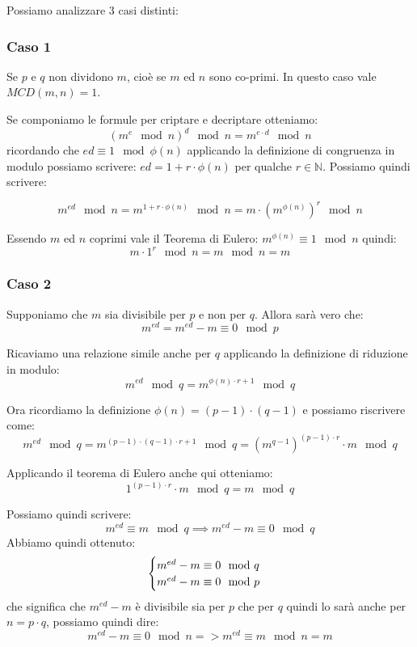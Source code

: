 Possiamo analizzare 3 casi distinti:

\subsubsection{Caso 1}
Se $p$ e $q$ non dividono $m$, cioè se $m$ ed $n$ sono co-primi. In questo caso vale $MCD(m,n)=1$.

Se componiamo le formule per criptare e decriptare otteniamo:
$$ (m^e \mod n)^d \mod n = m^{e \cdot d} \mod n $$
ricordando che $ed \equiv 1 \mod \phi(n)$ applicando la definizione di congruenza in modulo possiamo scrivere: $ed = 1 + r \cdot \phi(n)$ per qualche $r \in \mathbb{N}$.
Possiamo quindi scrivere:

$$ m^{ed} \mod n = m^{1 + r \cdot \phi(n)} \mod n = m \cdot (m^{\phi(n)})^{r} \mod n$$

Essendo $m$ ed $n$ coprimi vale il Teorema di Eulero: $m^{\phi(n)} \equiv 1 \mod n$ quindi:
$$ m \cdot 1^r \mod n = m \mod n = m $$

\subsubsection{Caso 2}
Supponiamo che $m$ sia divisibile per $p$ e non per $q$. Allora sarà vero che:
$$ m^{ed} = m^{ed} - m \equiv 0 \mod p $$

Ricaviamo una relazione simile anche per $q$ applicando la definizione di riduzione in modulo:
$$ m^{ed} \mod q = m^{\phi(n) \cdot r + 1} \mod q $$

Ora ricordiamo la definizione $\phi(n) = (p-1)\cdot(q-1)$ e possiamo riscrivere come:
$$ m^{ed} \mod q = m^{(p-1)\cdot(q-1)\cdot{r} + 1} \mod q = (m^{q-1})^{(p-1)\cdot{r}}\cdot{m} \mod q $$

Applicando il teorema di Eulero anche qui otteniamo:
$$ 1^{(p-1)\cdot{r}}\cdot{m} \mod q = m \mod q$$

Possiamo quindi scrivere:
$$ m^{ed} \equiv m \mod q \implies m^{ed} - m \equiv 0 \mod q $$
Abbiamo quindi ottenuto:
\begin{equation}
    \begin{cases}
    $$ m^{ed} - m \equiv 0 \mod q $$ \\ 
    $$ m^{ed} - m \equiv 0 \mod p $$
    \end{cases}
\end{equation}
che significa che $ m^{ed} -m $ è divisibile sia per $p$ che per $q$ quindi lo sarà anche per $n = p \cdot q$, possiamo quindi dire:
$$ m^{ed} -m \equiv 0 \mod n => m^{ed} \equiv m \mod n = m $$

